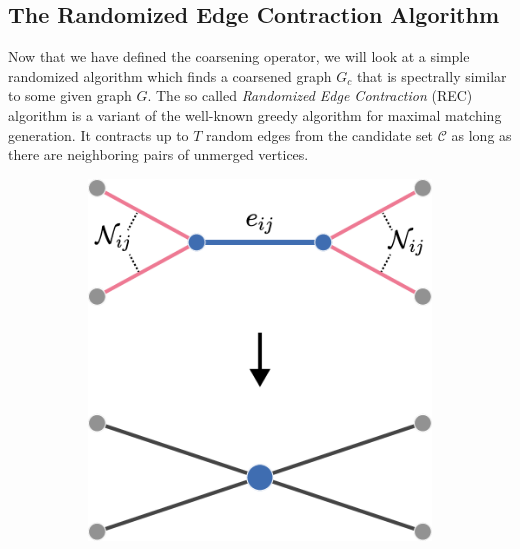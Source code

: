 \subsection{The Randomized Edge Contraction Algorithm}%
\label{sec:coarse:rec}

Now that we have defined the coarsening operator, we will look at a simple randomized algorithm which finds a coarsened graph $G_c$ that is spectrally similar to some given graph $G$.
The so called \textit{Randomized Edge Contraction} (REC) algorithm is a variant of the well-known greedy algorithm for maximal matching generation.
It contracts up to $T$ random edges from the candidate set $\mathcal{C}$ as long as there are neighboring pairs of unmerged vertices.
\begin{figure}
	\setlength{\intextsep}{0pt}
	\begin{minipage}{0.6\linewidth}
		\begin{algorithm}[H]
			\caption{Randomized Edge Contraction}\label{algo:coarse:rec}
			\begin{algorithmic}[1]
					\EndWhile{}
				\EndFunction{}
			\end{algorithmic}
		\end{algorithm}
	\end{minipage}%
	\begin{minipage}{0.4\linewidth}
		\begin{figure}[H]
			\centering
			\includegraphics[width=0.75\linewidth]{gfx/coarse/rec.pdf}

\end{figure}
\end{minipage}
\end{figure}
